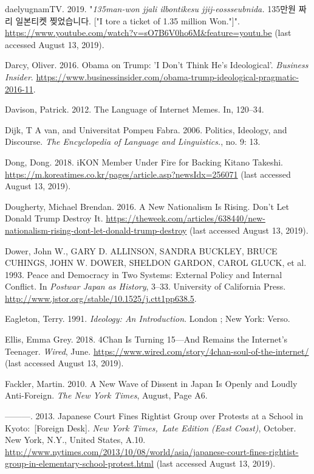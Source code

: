 \documentclass[10pt,british,A4paper,twoside]{memoir}
\begin{document}
\hypertarget{ref-daelyugnamtv_eng._2019}{}
daelyugnamTV. 2019. "\emph{135man-won jjali ilbontikesu jjij-eossseubnida.} 135만원 짜리 일본티켓 찢었습니다. ["I tore a ticket of 1.35 million Won."]".
\url{https://www.youtube.com/watch?v=sO7B6V0ho6M\&feature=youtu.be} (last accessed August 13, 2019).

\hypertarget{ref-darcy_obama_2016}{}
Darcy, Oliver. 2016. Obama on Trump: 'I Don't Think He's Ideological'.
\emph{Business Insider}.
\url{https://www.businessinsider.com/obama-trump-ideological-pragmatic-2016-11}.

\hypertarget{ref-davison_language_2012}{}
Davison, Patrick. 2012. The Language of Internet Memes. In, 120--34.

\hypertarget{ref-van_dijk_politics_2006}{}
Dijk, T A van, and Universitat Pompeu Fabra. 2006. Politics, Ideology,
and Discourse. \emph{The Encyclopedia of Language and Linguistics.}, no.
9: 13.

\hypertarget{ref-dong_ikon_2018}{}
Dong, Dong. 2018. iKON Member Under Fire for Backing Kitano Takeshi.
\url{https://m.koreatimes.co.kr/pages/article.asp?newsIdx=256071} (last accessed August 13, 2019).

\hypertarget{ref-dougherty_new_2016}{}
Dougherty, Michael Brendan. 2016. A New Nationalism Is Rising. Don't Let
Donald Trump Destroy It.
\url{https://theweek.com/articles/638440/new-nationalism-rising-dont-let-donald-trump-destroy} (last accessed August 13, 2019).

\hypertarget{ref-dower_peace_1993}{}
Dower, John W., GARY D. ALLINSON, SANDRA BUCKLEY, BRUCE CUHINGS, JOHN W.
DOWER, SHELDON GARDON, CAROL GLUCK, et al. 1993. Peace and Democracy in
Two Systems: External Policy and Internal Conflict. In \emph{Postwar
Japan as History}, 3--33. University of California Press.
\url{http://www.jstor.org/stable/10.1525/j.ctt1pp638.5}.

\hypertarget{ref-eagleton_ideology:_1991}{}
Eagleton, Terry. 1991. \emph{Ideology: An Introduction}. London ; New
York: Verso.

\hypertarget{ref-ellis_4chan_2018}{}
Ellis, Emma Grey. 2018. 4Chan Is Turning 15---And Remains the Internet's
Teenager. \emph{Wired}, June.
\url{https://www.wired.com/story/4chan-soul-of-the-internet/} (last accessed August 13, 2019).

\hypertarget{ref-fackler_new_2010-1}{}
Fackler, Martin. 2010. A New Wave of Dissent in Japan Is Openly and
Loudly Anti-Foreign. \emph{The New York Times}, August, Page A6.

\hypertarget{ref-fackler_japanese_2013}{}
---------. 2013. Japanese Court Fines Rightist Group over Protests at a
School in Kyoto:~{[}Foreign Desk{]}. \emph{New York Times,~Late Edition
(East Coast)}, October. New York, N.Y., United States, A.10.
\url{http://www.nytimes.com/2013/10/08/world/asia/japanese-court-fines-rightist-group-in-elementary-school-protest.html} (last accessed August 13, 2019).
\end{document}
